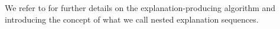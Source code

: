 We refer to \cite{ecai/BogaertsGCG20} for further details on the explanation-producing algorithm and \cite{bogaerts2020framework} introducing the concept of what we call nested explanation sequences.






